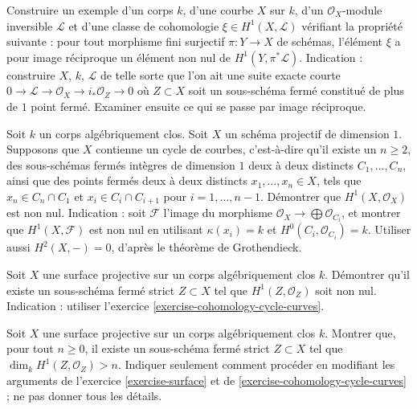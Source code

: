 \begin{exercise}
\label{exercise-nonkillable}
Construire un exemple d'un corps $k$, d'une courbe $X$ sur $k$,
d'un $\mathcal{O}_X$-module inversible $\mathcal{L}$ et
d'une classe de cohomologie $\xi \in H^1(X, \mathcal{L})$ vérifiant
la propriété suivante : pour tout morphisme fini surjectif
$\pi : Y \to X$ de schémas, l'élément $\xi$
a pour image réciproque un élément non nul de $H^1(Y, \pi^*\mathcal{L})$.
Indication : construire $X$, $k$, $\mathcal{L}$ de telle sorte que
l'on ait une suite exacte courte
$0 \to \mathcal{L} \to \mathcal{O}_X \to i_*\mathcal{O}_Z \to 0$
où $Z \subset X$ soit un sous-schéma fermé constitué de
plus de $1$ point fermé. Examiner ensuite ce qui se passe par
image réciproque.
\end{exercise}

\begin{exercise}
\label{exercise-cohomology-cycle-curves}
Soit $k$ un corps algébriquement clos.
Soit $X$ un schéma projectif de dimension $1$.
Supposons que $X$ contienne un cycle de courbes, c'est-à-dire qu'il
existe un $n \geq 2$, des sous-schémas fermés intègres
de dimension $1$ deux à deux distincts
$C_1, \ldots, C_n$, ainsi que des points fermés deux à deux distincts
$x_1, \ldots, x_n \in X$, tels que $x_n \in C_n \cap C_1$
et $x_i \in C_i \cap C_{i + 1}$
pour $i = 1, \ldots, n - 1$.
Démontrer que $H^1(X, \mathcal{O}_X)$ est non nul.
Indication : soit $\mathcal{F}$ l'image du morphisme
$\mathcal{O}_X \to \bigoplus \mathcal{O}_{C_i}$,
et montrer que $H^1(X, \mathcal{F})$ est non nul
en utilisant $\kappa(x_i) = k$ et $H^0(C_i, \mathcal{O}_{C_i}) = k$.
Utiliser aussi $H^2(X, -) = 0$, d'après le théorème de Grothendieck.
\end{exercise}

\begin{exercise}
\label{exercise-surface}
Soit $X$ une surface projective sur un corps algébriquement clos $k$.
Démontrer qu'il existe un sous-schéma fermé strict $Z \subset X$ tel que
$H^1(Z, \mathcal{O}_Z)$ soit non nul. Indication : utiliser
l'exercice \ref{exercise-cohomology-cycle-curves}.
\end{exercise}

\begin{exercise}
\label{exercise-surface-better}
Soit $X$ une surface projective sur un corps algébriquement clos $k$.
Montrer que, pour tout $n \geq 0$,
il existe un sous-schéma fermé strict $Z \subset X$ tel que
$\dim_k H^1(Z, \mathcal{O}_Z) > n$.
Indiquer seulement comment procéder en modifiant les arguments
de l'exercice \ref{exercise-surface} et de
\ref{exercise-cohomology-cycle-curves} ; ne pas donner tous les détails.
\end{exercise}

